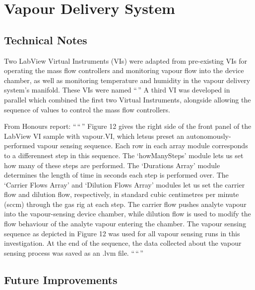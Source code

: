 \documentclass[
  a4paper,
]{scrbook}
\begin{document}
\hypertarget{vapour-delivery-system}{%
\chapter{Vapour Delivery System}\label{vapour-delivery-system}}

\hypertarget{technical-notes}{%
\section{Technical Notes}\label{technical-notes}}

Two LabView Virtual Instruments (VIs) were adapted from pre-existing VIs
for operating the mass flow controllers and monitoring vapour flow into
the device chamber, as well as monitoring temperature and humidity in
the vapour delivery system's manifold. These VIs were named ``\,'' A
third VI was developed in parallel which combined the first two Virtual
Instruments, alongside allowing the sequence of values to control the
mass flow controllers.

From Honours report: ``\,``\,'' Figure 12 gives the right side of the
front panel of the LabView VI sample with vapour.VI, which letsus preset
an autonomously-performed vapour sensing sequence. Each row in each
array module corresponds to a differennest step in this sequence. The
`howManySteps' module lets us set how many of these steps are performed.
The `Durations Array' module determines the length of time in seconds
each step is performed over. The `Carrier Flows Array' and `Dilution
Flows Array' modules let us set the carrier flow and dilution flow,
respectively, in standard cubic centimetres per minute (sccm) through
the gas rig at each step. The carrier flow pushes analyte vapour into
the vapour-sensing device chamber, while dilution flow is used to modify
the flow behaviour of the analyte vapour entering the chamber. The
vapour sensing sequence as depicted in Figure 12 was used for all vapour
sensing runs in this investigation. At the end of the sequence, the data
collected about the vapour sensing process was saved as an .lvm file.
``\,``\,''

\hypertarget{future-improvements}{%
\section{Future Improvements}\label{future-improvements}}


\backmatter
\printbibliography
\end{document}

